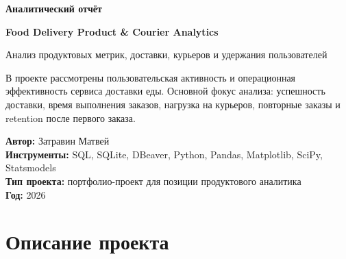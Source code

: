 \documentclass[12pt,a4paper]{article}
\begin{document}
\color{black}

\begin{titlepage}
    \thispagestyle{empty}
    \centering

    \vspace*{2.5cm}

    {\Large\bfseries Аналитический отчёт \par}

    \vspace{0.8cm}

    {\huge\bfseries Food Delivery Product \& Courier Analytics \par}

    \vspace{0.6cm}

    {\large Анализ продуктовых метрик, доставки, курьеров и удержания пользователей \par}

    \vspace{2cm}

    \begin{minipage}{0.78\textwidth}
        \normalsize
        В проекте рассмотрены пользовательская активность и операционная эффективность сервиса доставки еды. Основной фокус анализа: успешность доставки, время выполнения заказов, нагрузка на курьеров, повторные заказы и retention после первого заказа.
    \end{minipage}

    \vfill

    \begin{flushleft}
        \normalsize
        \textbf{Автор:} Затравин Матвей \\
        \textbf{Инструменты:} SQL, SQLite, DBeaver, Python, Pandas, Matplotlib, SciPy, Statsmodels \\
        \textbf{Тип проекта:} портфолио-проект для позиции продуктового аналитика \\
        \textbf{Год:} 2026
    \end{flushleft}

    \vspace{1cm}

\end{titlepage}

\tableofcontents
\newpage

\section{Описание проекта}
\end{document}
